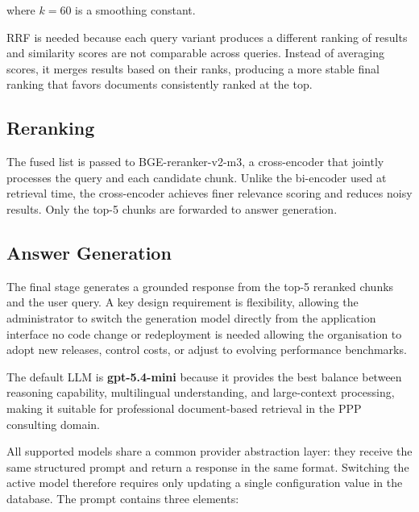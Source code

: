 where $k = 60$ is a smoothing constant. 

RRF is needed because each query variant produces a different ranking of results and similarity scores are not comparable across queries. Instead of averaging scores, it merges results based on their ranks, producing a more stable final ranking that favors documents consistently ranked at the top.

\subsection{Reranking}

The fused list is passed to BGE-reranker-v2-m3, a cross-encoder that
jointly processes the query and each candidate chunk. Unlike the bi-encoder
used at retrieval time, the cross-encoder achieves finer relevance scoring and
reduces noisy results. Only the top-5 chunks are forwarded to answer
generation.

\subsection{Answer Generation}
\label{sec:llm_generation}

The final stage generates a grounded response from the top-5 reranked chunks
and the user query. A key design requirement is flexibility, allowing the administrator to
switch the generation model directly from the application interface no
code change or redeployment is needed allowing the organisation to adopt
new releases, control costs, or adjust to evolving performance benchmarks.

The default LLM is \textbf{gpt-5.4-mini} because it provides the best balance between
reasoning capability, multilingual understanding, and large-context processing, making it suitable
for professional document-based retrieval in the PPP consulting domain.

All supported models share a common provider abstraction layer: they receive
the same structured prompt and return a response in the same format. Switching
the active model therefore requires only updating a single configuration value
in the database. The prompt contains three elements:

